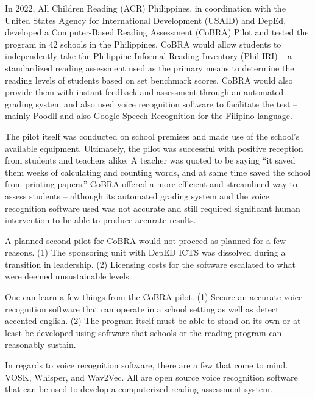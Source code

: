 In 2022, All Children Reading (ACR) Philippines, in coordination with the United States Agency for International Development (USAID) and DepEd, developed a Computer-Based Reading Assessment (CoBRA) Pilot and tested the program in 42 schools in the Philippines. CoBRA would allow students to independently take the Philippine Informal Reading Inventory (Phil-IRI) – a standardized reading assessment used as the primary means to determine the reading levels of students based on set benchmark scores. CoBRA would also provide them with instant feedback and assessment through an automated grading system and also used voice recognition software to facilitate the test – mainly Poodll and also Google Speech Recognition for the Filipino language. \nocite{UnitedStatesAgencyforInternationalDevelopment_2022}

The pilot itself was conducted on school premises and made use of the school’s available equipment. Ultimately, the pilot was successful with positive reception from students and teachers alike. A teacher was quoted to be saying “it saved them weeks of calculating and counting words, and at same time saved the school from printing papers.” CoBRA offered a more efficient and streamlined way to assess students – although its automated grading system and the voice recognition software used was not accurate and still required significant human intervention to be able to produce accurate results.

A planned second pilot for CoBRA would not proceed as planned for a few reasons. (1) The sponsoring unit with DepED ICTS was dissolved during a transition in leadership. (2) Licensing costs for the software escalated to what were deemed unsustainable levels.

One can learn a few things from the CoBRA pilot. (1) Secure an accurate voice recognition software that can operate in a school setting as well as detect accented english. (2) The program itself must be able to stand on its own or at least be developed using software that schools or the reading program can reasonably sustain.

In regards to voice recognition software, there are a few that come to mind. VOSK, Whisper, and Wav2Vec. All are open source voice recognition software that can be used to develop a computerized reading assessment system.
